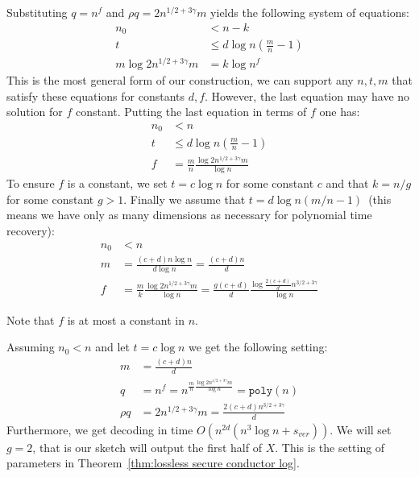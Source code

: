 \documentclass[11pt]{article}
\newcommand{\thref}[1]{\mbox{Theorem~\ref{#1}}}
\newcommand{\poly}{\ensuremath{\mathtt{poly}}\xspace}
\newcommand{\authnote}[2]{{\textcolor{red}{\textsf{#1 notes: }\textcolor{blue}{ #2}}\marginpar{\textcolor{red}{\textbf{!!!!!}}}}}
\newcommand{\authnote}[2]{}
\newcommand{\xnote}[1]{{\authnote{Xianrui}{#1}}}
\begin{document}
Substituting $q = n^f$ and $\rho q = 2n^{1/2+3\gamma}m$ yields the following system of equations:
\begin{align*}
n_0&< n - k\\
t&\leq d\log n\left(\frac{m}{n}-1\right)\\
m \log 2n^{1/2+3\gamma}m &= k \log n^f
\end{align*}
This is the most general form of our construction, we can support any $n, t, m$ that satisfy these equations for constants $d, f$.  However, the last equation may have no solution for $f$ constant.  Putting the last equation in terms of $f$ one has:
\begin{align*}
n_0&< n\\
t&\leq d\log n\left(\frac{ m }{n} -1\right)\\
f &= \frac{m}{n}\frac{\log 2n^{1/2+3\gamma} m}{\log n}
\end{align*}
To ensure $f$ is a constant, we set $t = c \log n$ for some constant $c$ and that $k = n /g$ for some constant $g> 1$.  Finally we assume that $t = d \log n(m/n-1)$~(this means we have only as many dimensions as necessary for polynomial time recovery):
\begin{align*}
n_0&< n\\
m &= \frac{(c+d)n \log n}{d \log n} = \frac{(c+d)n}{d}\\
f &= \frac{m}{k}\frac{\log 2n^{1/2+3\gamma}m}{\log n} = \frac{g(c+d)}{d}\frac{\log \frac{2(c+d)}{d} n^{3/2+3\gamma}}{\log n}
\end{align*}

Note that $f$ is at most a constant in $n$.

Assuming $n_0 < n$ and let $t= c\log n$ we get the following setting:
\begin{align*}
m &= \frac{(c+d)n}{d}\\
q & = n^f = n^{\frac{m}{n}\frac{\log 2n^{1/2+3\gamma}m}{\log n}} = \poly(n)\\
\rho q &= 2n^{1/2+3\gamma}m = \frac{2(c+d)n^{3/2+3\gamma}}{d}
\end{align*}
Furthermore, we get decoding in time $O(n^{2d}(n^3\log n+s_{ver}))$.  We will set $g = 2$, that is our sketch will output the first half of $X$. This is the setting of parameters in \thref{thm:lossless secure conductor log}.
\end{document}
